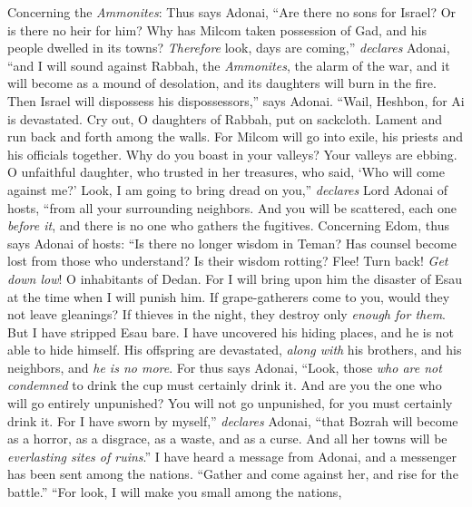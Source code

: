 \begin{biblechapter} %
 Concerning the \textit{Ammonites}: Thus says Adonai,
\verse “Are there no sons for Israel? 
Or is there no heir for him? 
Why has Milcom taken possession of Gad, 
and his people dwelled in its towns?
\verse \textit{Therefore} look, days are coming,” \textit{declares} Adonai, 
“and I will sound against Rabbah, the \textit{Ammonites}, 
the alarm of the war, 
and it will become as a mound of desolation, 
and its daughters will burn in the fire. 
Then Israel will dispossess his dispossessors,” says Adonai.
\verse “Wail, Heshbon, for Ai is devastated. 
Cry out, O daughters of Rabbah, put on sackcloth. 
Lament and run back and forth among the walls. 
For Milcom will go into exile, 
his priests and his officials together.
\verse Why do you boast in your valleys? 
Your valleys are ebbing. 
O unfaithful daughter, who trusted in her treasures, 
who said, ‘Who will come against me?’
\verse Look, I am going to bring dread on you,” 
\textit{declares} Lord Adonai of hosts, 
“from all your surrounding neighbors. 
And you will be scattered, 
each one \textit{before it}, 
and there is no one who gathers the fugitives.
 Concerning Edom, thus says Adonai of hosts:
\verse “Is there no longer wisdom in Teman? 
Has counsel become lost from those who understand? 
Is their wisdom rotting?
\verse Flee! Turn back! \textit{Get down low}! 
O inhabitants of Dedan. 
For I will bring upon him the disaster of Esau 
at the time when I will punish him.
\verse If grape-gatherers come to you, 
would they not leave gleanings? 
If thieves in the night, 
they destroy only \textit{enough for them}.
\verse But I have stripped Esau bare. 
I have uncovered his hiding places, 
and he is not able to hide himself. 
His offspring are devastated, \textit{along with} his brothers, 
and his neighbors, and \textit{he is no more}.
\verse For thus says Adonai, “Look, those \textit{who are not condemned} to drink the cup must certainly drink it. And are you the one who will go entirely unpunished? You will not go unpunished, for you must certainly drink it.
\verse For I have sworn by myself,” \textit{declares} Adonai, “that Bozrah will become as a horror, as a disgrace, as a waste, and as a curse. And all her towns will be \textit{everlasting sites of ruins}.”
\verse I have heard a message from Adonai, 
and a messenger has been sent among the nations. 
“Gather and come against her, 
and rise for the battle.”
\verse “For look, I will make you small among the nations, 

\end{biblechapter}
